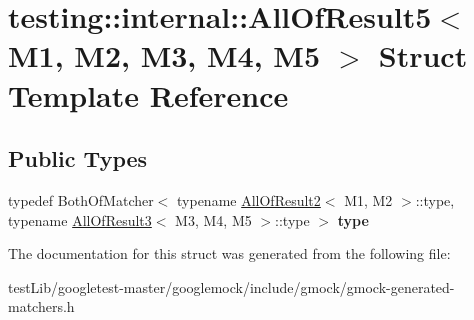 \hypertarget{structtesting_1_1internal_1_1AllOfResult5}{}\section{testing\+:\+:internal\+:\+:All\+Of\+Result5$<$ M1, M2, M3, M4, M5 $>$ Struct Template Reference}
\label{structtesting_1_1internal_1_1AllOfResult5}
\subsection*{Public Types}
\begin{DoxyCompactItemize}
\item 
\mbox{\label{structtesting_1_1internal_1_1AllOfResult5_aee2e1fb803f428741d147347b692d108}} 
typedef Both\+Of\+Matcher$<$ typename \hyperlink{structtesting_1_1internal_1_1AllOfResult2}{All\+Of\+Result2}$<$ M1, M2 $>$\+::type, typename \hyperlink{structtesting_1_1internal_1_1AllOfResult3}{All\+Of\+Result3}$<$ M3, M4, M5 $>$\+::type $>$ {\bfseries type}
\end{DoxyCompactItemize}


The documentation for this struct was generated from the following file\+:\begin{DoxyCompactItemize}
\item 
test\+Lib/googletest-\/master/googlemock/include/gmock/gmock-\/generated-\/matchers.\+h\end{DoxyCompactItemize}

